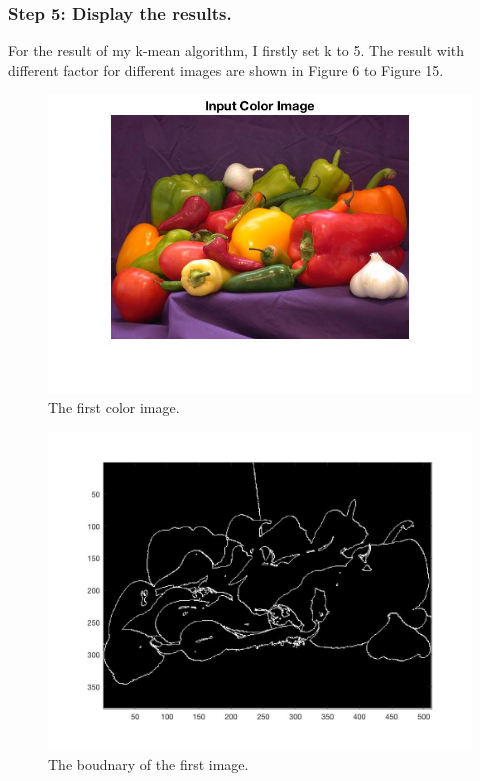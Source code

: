 \documentclass{article}
\begin{document}
\subsubsection*{Step 5: Display the results.}
For the result of my k-mean algorithm, I firstly set k to 5. The result with different factor for different images are shown in Figure 6 to Figure 15.

\begin{figure}[htbp]
    \centering
    \includegraphics[scale = 0.25]{fig6.jpg}
    \caption{The first color image.}
    \label{fig6}
\end{figure}\begin{figure}[htbp]
    \centering
    \includegraphics[scale = 0.25]{fig8.jpg}
    \caption{The boudnary of the first image.}
    \label{fig7}
\end{figure}
\end{document}
